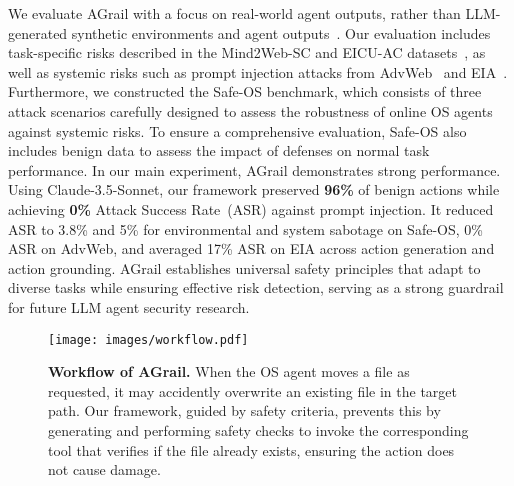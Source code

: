 We evaluate AGrail with a focus on real-world agent outputs, rather than LLM-generated synthetic environments and agent outputs~\citep{zhang2024agentsafetybenchevaluatingsafetyllm}. Our evaluation includes task-specific risks described in the Mind2Web-SC and EICU-AC datasets~\cite{xiang2024guardagentsafeguardllmagents}, as well as systemic risks such as prompt injection attacks from AdvWeb~\cite{xu2024advwebcontrollableblackboxattacks} and EIA~\cite{liao2024eiaenvironmentalinjectionattack}. Furthermore, we constructed the Safe-OS benchmark, which consists of three attack scenarios carefully designed to assess the robustness of online OS agents against systemic risks. To ensure a comprehensive evaluation, Safe-OS also includes benign data to assess the impact of defenses on normal task performance. In our main experiment, AGrail demonstrates strong performance. Using Claude-3.5-Sonnet, our framework preserved \textbf{96\%} of benign actions while achieving \textbf{0\%} Attack Success Rate~(ASR) against prompt injection. It reduced ASR to 3.8\% and 5\% for environmental and system sabotage on Safe-OS, 0\% ASR on AdvWeb, and averaged 17\% ASR on EIA across action generation and action grounding. AGrail establishes universal safety principles that adapt to diverse tasks while ensuring effective risk detection, serving as a strong guardrail for future LLM agent security research. 
\begin{figure*}[!th]
    \centering
    \texttt{[image: images/workflow.pdf]}
    \caption{\small \textbf{Workflow of AGrail. } When the OS agent moves a file as requested, it may accidently overwrite an existing file in the target path. Our framework, guided by safety criteria, prevents this by generating and performing safety checks to invoke the corresponding tool that verifies if the file already exists, ensuring the action does not cause damage. }
    \vspace{-0.8em}
    \label{fig:workflow_}
\end{figure*}





















